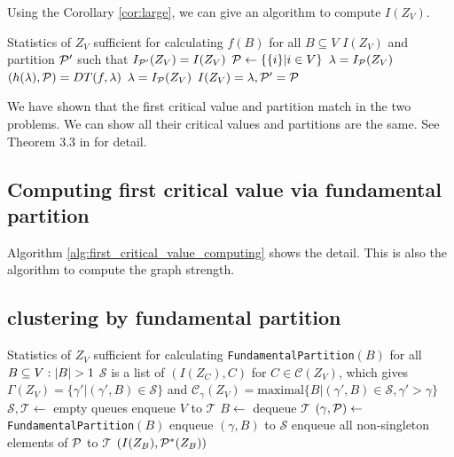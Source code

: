 \documentclass{article}
\begin{document}
Using the Corollary \ref{cor:large}, we can give an algorithm to compute $I(Z_V)$.
\begin{algorithm}\label{alg:first_critical_value_computing}
	\begin{algorithmic}[1]
		\REQUIRE Statistics of $Z_V$ sufficient for calculating $f(B)$ for all $B \subseteq V$
		\ENSURE $I(Z_V)$ and partition $\P'$ such that $I_{\P'}(Z_V) = I(Z_V)$
		\STATE $\P \leftarrow \{ \{i \} | i \in V\}$
		\STATE $\lambda = I_{\P}(Z_V)$
		\STATE $(h(\lambda), \P)=DT(f,\lambda)$
		\STATE $\lambda = I_{\P}(Z_V)$
		\ENDWHILE
		\STATE $I(Z_V) = \lambda, \P' = \P$
	\end{algorithmic}
\end{algorithm}

We have shown that the first critical value and partition match in the two problems. We can show all their critical values and partitions are the same. See Theorem 3.3 in \cite{ic} for detail.

\subsection{Computing first critical value via fundamental partition}
Algorithm \ref{alg:first_critical_value_computing} shows the detail. This is also the algorithm to compute the graph strength.

\subsection{clustering by fundamental partition}
\begin{algorithm}
\begin{algorithmic}[1]
\REQUIRE Statistics of $Z_V$ sufficient for calculating \texttt{FundamentalPartition}$(B)$ for all $B \subseteq V:\abs{B}>1$
\ENSURE $\mathcal{S}$ is a list of $(I(Z_C),C)$ for $ C \in \mathcal{C}(Z_V)$, which gives
$\Gamma(Z_V) = \{ \gamma' | (\gamma', B) \in \mathcal{S}\} $ and $ \mathcal{C}_{\gamma}(Z_V)
= \mathrm{maximal}\{B | (\gamma', B) \in \mathcal{S}, \gamma' > \gamma \}$
\STATE $\mathcal{S},\mathcal{T} \leftarrow$ empty queues
\STATE enqueue $V$ to $\mathcal{T}$
\STATE $B \leftarrow $ dequeue $\mathcal{T}$
\STATE $(\gamma, \P) \leftarrow$\texttt{FundamentalPartition}$(B)$
\STATE enqueue $(\gamma, B)$ to $\mathcal{S}$
\STATE enqueue all non-singleton elements of $\P$ to $\mathcal{T}$
\ENDWHILE
{}
  \RETURN $(I(Z_B), \P^*(Z_B))$
\ENDFUNCTION
\end{algorithmic}
\end{algorithm}
\end{document}
